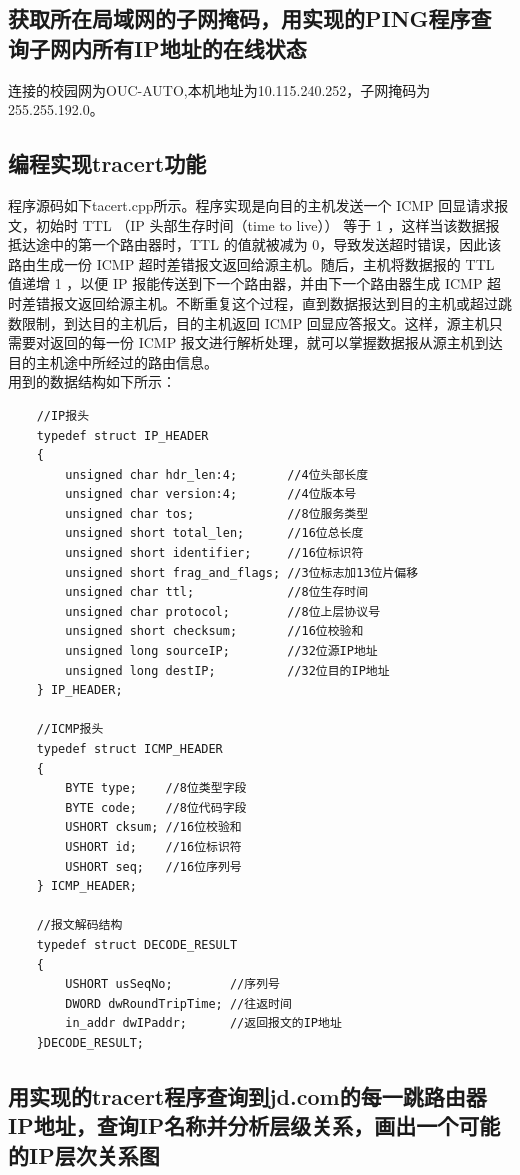 \documentclass[a4paper,UTF8]{article}
\begin{document}
\subsection{获取所在局域网的子网掩码，用实现的PING程序查询子网内所有IP地址的在线状态}
连接的校园网为OUC-AUTO,本机地址为10.115.240.252，子网掩码为255.255.192.0。
\subsection{编程实现tracert功能}
程序源码如下tacert.cpp所示。程序实现是向目的主机发送一个 ICMP 回显请求报文，初始时 TTL （IP 头部生存时间（time to live）） 等于 1 ，这样当该数据报抵达途中的第一个路由器时，TTL 的值就被减为 0，导致发送超时错误，因此该路由生成一份 ICMP 超时差错报文返回给源主机。随后，主机将数据报的 TTL 值递增 1 ，以便 IP 报能传送到下一个路由器，并由下一个路由器生成 ICMP 超时差错报文返回给源主机。不断重复这个过程，直到数据报达到目的主机或超过跳数限制，到达目的主机后，目的主机返回 ICMP 回显应答报文。这样，源主机只需要对返回的每一份 ICMP 报文进行解析处理，就可以掌握数据报从源主机到达目的主机途中所经过的路由信息。\\
用到的数据结构如下所示：
\begin{lstlisting}
    //IP报头
    typedef struct IP_HEADER
    {
        unsigned char hdr_len:4;       //4位头部长度
        unsigned char version:4;       //4位版本号
        unsigned char tos;             //8位服务类型
        unsigned short total_len;      //16位总长度
        unsigned short identifier;     //16位标识符
        unsigned short frag_and_flags; //3位标志加13位片偏移
        unsigned char ttl;             //8位生存时间
        unsigned char protocol;        //8位上层协议号
        unsigned short checksum;       //16位校验和
        unsigned long sourceIP;        //32位源IP地址
        unsigned long destIP;          //32位目的IP地址
    } IP_HEADER;

    //ICMP报头
    typedef struct ICMP_HEADER
    {
        BYTE type;    //8位类型字段
        BYTE code;    //8位代码字段
        USHORT cksum; //16位校验和
        USHORT id;    //16位标识符
        USHORT seq;   //16位序列号
    } ICMP_HEADER;

    //报文解码结构
    typedef struct DECODE_RESULT
    {
        USHORT usSeqNo;        //序列号
        DWORD dwRoundTripTime; //往返时间
        in_addr dwIPaddr;      //返回报文的IP地址
    }DECODE_RESULT;
\end{lstlisting}
\subsection{用实现的tracert程序查询到jd.com的每一跳路由器IP地址，查询IP名称并分析层级关系，画出一个可能的IP层次关系图}
\end{document}
